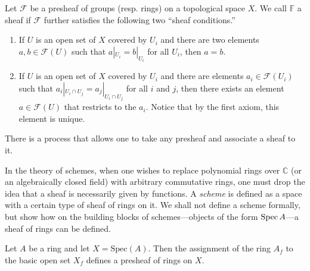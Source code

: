 
\begin{definition} Let $\mathcal{F}$ be a presheaf of groups (resp. rings) on a topological space $X$. We call $\mathbb{F}$ a sheaf if $\mathcal{F}$ further satisfies the following two ``sheaf conditions.''\begin{enumerate}
\item{If $U$ is an open set of $X$ covered by $U_i$ and there are two elements $a,b\in \mathcal{F}(U)$ such that $a|_{U_i}=b|_{U_i}$ for all $U_i$, then $a=b$.}
\item{If $U$ is an open set of $X$ covered by $U_i$ and there are elements $a_i\in \mathcal{F}(U_i)$ such that $a_i|_{U_i\cap U_j} = a_j|_{U_i\cap U_j}$ for all $i$ and $j$, then there exists an element $a\in\mathcal{F}(U)$ that restricts to the $a_i$. Notice that by the first axiom, this element is unique.}
\end{enumerate}
\end{definition}

There is a process that allows one to take any presheaf and associate a sheaf to it. 

In the theory of schemes, when one wishes to replace polynomial rings over
$\mathbb{C}$ (or an algebraically closed field) with arbitrary commutative
rings, one must drop the idea that a sheaf is necessarily given by functions. 
A \emph{scheme} is defined as a space with a certain type of sheaf of rings on
it. We shall not define a scheme formally, but show how on the building blocks
of schemes---objects of the form $\operatorname{Spec} A$---a sheaf of rings can be defined.

\begin{proposition}
Let $ A$ be a ring and let $ X = \mathrm{Spec}(A)$. Then the assignment of the ring $A_f$ to the basic open set $X_f$ defines a presheaf of rings on $X$.
\end{proposition}

